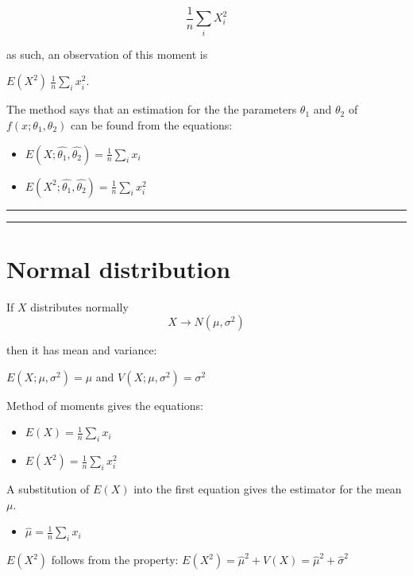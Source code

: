 \documentclass[
]{book}
\providecommand{\tightlist}{%
  \setlength{\itemsep}{0pt}\setlength{\parskip}{0pt}}
\begin{document}
\[\frac{1}{n}\sum_i X^2_i\]

as such, an observation of this moment is

\(E(X ^ 2)~\frac{1}{n}\sum_i x^2_i\).

The method says that an estimation for the the parameters \(\theta_1\) and \(\theta_2\) of \(f(x;\theta_1,\theta_2)\) can be found from the equations:

\begin{itemize}
\item
  \(E(X; \hat{\theta_1}, \hat{\theta_2})= \frac{1}{n}\sum_i x_i\)
\item
  \(E(X^2; \hat{\theta_1}, \hat{\theta_2})=\frac{1}{n}\sum_i x^2_i\)
\end{itemize}

\begin{center}\rule{0.5\linewidth}{0.5pt}\end{center}

\begin{center}\rule{0.5\linewidth}{0.5pt}\end{center}

\hypertarget{normal-distribution-13}{%
\section{Normal distribution}\label{normal-distribution-13}}

If \(X\) distributes normally\\
\[X \rightarrow N(\mu, \sigma^2)\]

then it has mean and variance:

\(E(X; \mu, \sigma^2)=\mu\) and
\(V(X; \mu, \sigma^2)=\sigma^2\)

Method of moments gives the equations:

\begin{itemize}
\tightlist
\item
  \(E(X)=\frac{1}{n}\sum_i x_i\)
\item
  \(E(X^2)=\frac{1}{n}\sum_i x^2_i\)
\end{itemize}

A substitution of \(E(X)\) into the first equation gives the estimator for the mean \(\mu\).

\begin{itemize}
\tightlist
\item
  \(\hat{\mu}=\frac{1}{n}\sum_i x_i\)
\end{itemize}

\(E(X^2)\) follows from the property: \(E(X^2) = \hat{\mu}^2 + V(X)= \hat{\mu}^2+\hat{\sigma}^2\)
\end{document}
